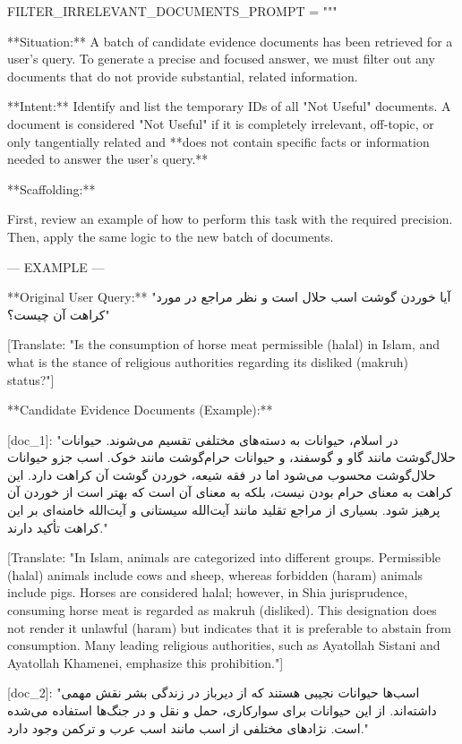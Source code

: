 \documentclass[11pt]{article}
\begin{document}
\begin{PromptBlock}
FILTER_IRRELEVANT_DOCUMENTS_PROMPT = """

**Situation:** A batch of candidate evidence documents has been retrieved for a user's query. To generate a precise and focused answer, we must filter out any documents that do not provide substantial, related information.

**Intent:** Identify and list the temporary IDs of all "Not Useful" documents. A document is considered "Not Useful" if it is completely irrelevant, off-topic, or only tangentially related and **does not contain specific facts or information needed to answer the user's query.**

**Scaffolding:**

First, review an example of how to perform this task with the required precision. Then, apply the same logic to the new batch of documents.

--- EXAMPLE ---

**Original User Query:** "آیا خوردن گوشت اسب حلال است و نظر مراجع در مورد کراهت آن چیست؟"

[Translate: "Is the consumption of horse meat permissible (halal) in Islam, and what is the stance of religious authorities regarding its disliked (makruh) status?"]

**Candidate Evidence Documents (Example):**

[doc_1]: "در اسلام، حیوانات به دسته‌های مختلفی تقسیم می‌شوند. حیوانات حلال‌گوشت مانند گاو و گوسفند، و حیوانات حرام‌گوشت مانند خوک. اسب جزو حیوانات حلال‌گوشت محسوب می‌شود اما در فقه شیعه، خوردن گوشت آن کراهت دارد. این کراهت به معنای حرام بودن نیست، بلکه به معنای آن است که بهتر است از خوردن آن پرهیز شود. بسیاری از مراجع تقلید مانند آیت‌الله سیستانی و آیت‌الله خامنه‌ای بر این کراهت تأکید دارند."

[Translate: "In Islam, animals are categorized into different groups. Permissible (halal) animals include cows and sheep, whereas forbidden (haram) animals include pigs. Horses are considered halal; however, in Shia jurisprudence, consuming horse meat is regarded as makruh (disliked). This designation does not render it unlawful (haram) but indicates that it is preferable to abstain from consumption. Many leading religious authorities, such as Ayatollah Sistani and Ayatollah Khamenei, emphasize this prohibition."]

[doc_2]: "اسب‌ها حیوانات نجیبی هستند که از دیرباز در زندگی بشر نقش مهمی داشته‌اند. از این حیوانات برای سوارکاری، حمل و نقل و در جنگ‌ها استفاده می‌شده است. نژادهای مختلفی از اسب مانند اسب عرب و ترکمن وجود دارد."


\end{PromptBlock}
\end{document}
